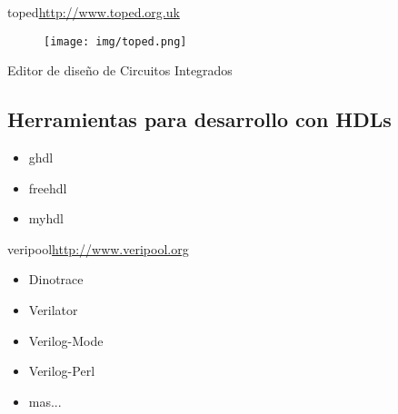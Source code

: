 \documentclass{beamer}
\begin{document}
\begin{frame}{toped}{\url{http://www.toped.org.uk}}
  \begin{figure}[!h]
    \centering
    \texttt{[image: img/toped.png]}
  \end{figure}
  Editor de diseño de Circuitos Integrados
\end{frame}

\subsection{Herramientas para desarrollo con HDLs}

\begin{frame}
  \begin{itemize}
  \item ghdl
  \item freehdl
  \item myhdl
  \end{itemize}
\end{frame}
\begin{frame}{veripool}{\url{http://www.veripool.org}}
  \begin{itemize}
  \item Dinotrace
  \item Verilator
  \item Verilog-Mode
  \item Verilog-Perl
  \item mas...
  \end{itemize}
\end{frame}


  

\end{document}
